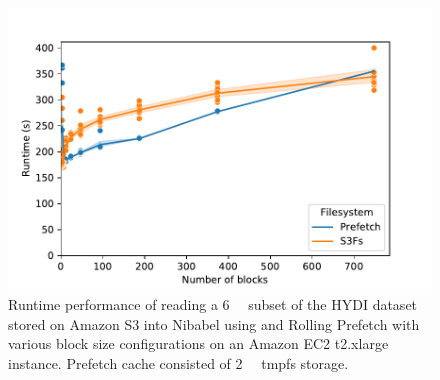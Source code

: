 \documentclass[conference]{IEEEtran}
\begin{document}
\begin{figure}
\begin{center}
\includegraphics[width=\columnwidth]{figures/blocksize.pdf}
\setlength{\abovecaptionskip}{-10pt}
 \setlength{\belowcaptionskip}{-20pt}
\caption{Runtime performance of reading a \SI{6}{\gibi\byte} subset of the HYDI dataset stored on Amazon S3 into Nibabel using
\sfs and Rolling Prefetch with various block size configurations on an Amazon EC2 t2.xlarge instance. Prefetch cache consisted of  \SI{2}{\gibi\byte} tmpfs storage.}
\label{fig:blocksize}
\end{center}
\end{figure}



\end{document}
